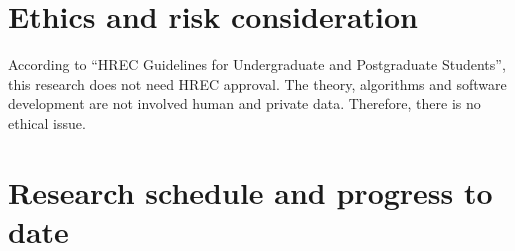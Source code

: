 \section{Ethics and risk consideration}
According to “HREC Guidelines for Undergraduate and Postgraduate Students”, this research does not need HREC approval. The theory, algorithms and software development are not involved human and private data. Therefore, there is no ethical issue.

\section{Research schedule and progress to date}

